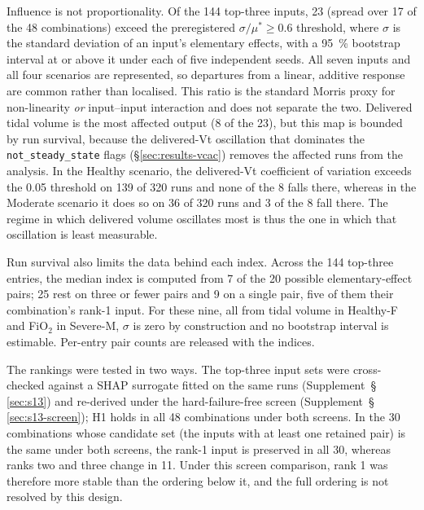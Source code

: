 \documentclass[pdflatex,sn-nature]{sn-jnl}%
\begin{document}
Influence is not proportionality. Of the 144 top-three inputs, 23 (spread over 17 of the 48 combinations) exceed the preregistered $\sigma / \mu^{*} \geq 0.6$ threshold, where $\sigma$ is the standard deviation of an input's elementary effects, with a 95~\% bootstrap interval at or above it under each of five independent seeds. All seven inputs and all four scenarios are represented, so departures from a linear, additive response are common rather than localised. This ratio is the standard Morris proxy for non-linearity \emph{or} input--input interaction and does not separate the two. Delivered tidal volume is the most affected output (8 of the 23), but this map is bounded by run survival, because the delivered-Vt oscillation that dominates the \texttt{not\_steady\_state} flags (\S\ref{sec:results-vcac}) removes the affected runs from the analysis. In the Healthy scenario, the delivered-Vt coefficient of variation exceeds the 0.05 threshold on 139 of 320 runs and none of the 8 falls there, whereas in the Moderate scenario it does so on 36 of 320 runs and 3 of the 8 fall there. The regime in which delivered volume oscillates most is thus the one in which that oscillation is least measurable.

Run survival also limits the data behind each index. Across the 144 top-three entries, the median index is computed from 7 of the 20 possible elementary-effect pairs; 25 rest on three or fewer pairs and 9 on a single pair, five of them their combination's rank-1 input. For these nine, all from tidal volume in Healthy-F and FiO$_2$ in Severe-M, $\sigma$ is zero by construction and no bootstrap interval is estimable. Per-entry pair counts are released with the indices.

The rankings were tested in two ways. The top-three input sets were cross-checked against a SHAP surrogate fitted on the same runs (Supplement~\S\,\ref{sec:s13}) and re-derived under the hard-failure-free screen (Supplement~\S\,\ref{sec:s13-screen}); H1 holds in all 48 combinations under both screens. In the 30 combinations whose candidate set (the inputs with at least one retained pair) is the same under both screens, the rank-1 input is preserved in all 30, whereas ranks two and three change in 11. Under this screen comparison, rank 1 was therefore more stable than the ordering below it, and the full ordering is not resolved by this design.
\end{document}
